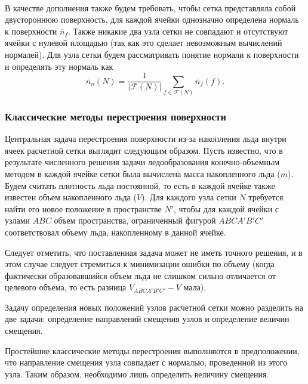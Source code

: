 \

В качестве дополнения также будем требовать, чтобы сетка представляла собой двустороннюю поверхность, для каждой ячейки однозначно определена нормаль к поверхности $\overline{n}_f$.
Также никакие два узла сетки не совпадают и отсутствуют ячейки с нулевой площадью (так как это сделает невозможным вычислений нормалей).
Для узла сетки будем рассматривать понятие нормали к поверхности и определять эту нормаль как
\begin{equation}
\overline{n}_n(N) = \frac{1}{|\mathscr{F}(N)|} \sum_{f \in \mathscr{F}(N)}{\overline{n}_f(f)}.
\end{equation}


\subsubsection{Классические методы перестроения поверхности}

Центральная задача перестроения поверхности из-за накопления льда внутри ячеек расчетной сетки выглядит следующим образом.
Пусть известно, что в результате численного решения задачи ледообразования конечно-объемным методом \cite{Beaugendre2003Ice} в каждой ячейке сетки была вычислена масса накопленного льда ($m$).
Будем считать плотность льда постоянной, то есть в каждой ячейке также известен объем накопленного льда ($V$).
Для каждого узла сетки $N$ требуется найти его новое положение в пространстве $N'$, чтобы для каждой ячейки с узлами $ABC$ объем пространства, ограниченный фигурой $ABCA'B'C'$ соответствовал объему льда, накопленному в данной ячейке.

Следует отметить, что поставленная задача может не иметь точного решения, и в этом случае следует стремиться к минимизации ошибки по объему (когда фактически образовавшийся объем льда не слишком сильно отличается от целевого объема, то есть разница $V_{ABCA'B'C'} - V$ мала).

Задачу определения новых положений узлов расчетной сетки можно разделить на две задачи: определение направлений смещения узлов и определение величин смещения.

Простейшие классические методы перестроения выполняются в предположении, что направление смещения узла совпадает с нормалью, проведенной из этого узла.
Таким образом, необходимо лишь определить величину смещения.

